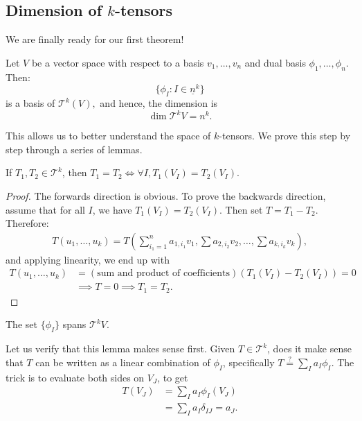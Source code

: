 \documentclass{article}
\numberwithin{equation}{section}
\begin{document}
\subsection{Dimension of $k$-tensors}
We are finally ready for our first theorem!
\begin{theorem}
    Let $V$ be a vector space with respect to a basis $v_1,\dots,v_n$ and dual basis $\phi_1,\dots,\phi_n$. Then:
    \begin{equation}
        \{\phi_I:I\in \underline{n}^k\}
    \end{equation}
    is a basis of $\mathcal{T}^k(V),$ and hence, the dimension is
    \begin{equation}
        \dim \mathcal{T}^kV = n^k.
    \end{equation}
\end{theorem}
This allows us to better understand the space of $k$-tensors. We prove this step by step through a series of lemmas.
\begin{lemma}
    If $T_1,T_2\in\mathcal{T}^k$, then $T_1=T_2 \iff \forall I, T_1(V_I)=T_2(V_I)$.
\end{lemma}
\begin{proof}
    The forwards direction is obvious. To prove the backwards direction, assume that for all $I$, we have $T_1(V_I)=T_2(V_I)$. Then set $T=T_1-T_2$. Therefore:
    \begin{align*}
        T(u_1,\dots,u_k) = T\left(\sum_{{i_1}=1}^n a_{1,i_1}v_1,\sum a_{2,i_2}v_2,\dots,\sum a_{k,i_k}v_k\right),
    \end{align*}
    and applying linearity, we end up with
    \begin{align*}
        T(u_1,\dots,u_k) &= (\text{sum and product of coefficients})(T_1(V_I)-T_2(V_I)) = 0 \\ 
        &\implies T = 0 \implies T_1=T_2.
    \end{align*}
\end{proof}
\begin{lemma}
    The set $\{\phi_I\}$ spans $\mathcal{T}^kV.$
\end{lemma}
Let us verify that this lemma makes sense first. Given $T\in \mathcal{T}^k$, does it make sense that $T$ can be written as a linear combination of $\phi_I$, specifically $T\stackrel{?}{=} \sum_I a_I\phi_I.$ The trick is to evaluate both sides on $V_J$, to get
\begin{align*}
    T(V_J) &= \sum_I a_I\phi_I(V_J) \\ 
    &= \sum_{I} a_I\delta_{IJ} = a_J.
\end{align*}
\end{document}
